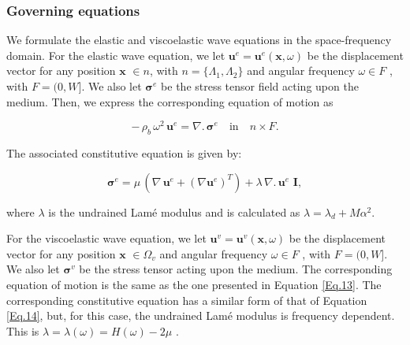 \documentclass[draft]{agujournal2019}
\begin{document}
\subsubsection{Governing equations}
We formulate the elastic and viscoelastic wave equations in the space-frequency domain. For the elastic wave equation, we let $\bm{u}^e=\bm{u}^e (\bm{x},\omega)$ be the displacement vector for any position $\bm{x}$ $\in n$, with  $n= \{\Lambda_1, \Lambda_2\} $ and angular frequency  $\omega \in F$ , with $F =(0,W]$. We also let $\bm{\sigma}^e$ be the stress tensor field acting upon the medium. Then, we express the corresponding equation of motion as
\begin{linenomath*}
\begin{equation}\label{Eq.13}
- \, \rho_b \,\omega^2 \, \bm{u}^e = \nabla . \, \bm{\sigma}^e \quad  \textrm{in} \quad n \times F.
\end{equation}
\end{linenomath*}
The associated constitutive equation is given by: 
\begin{linenomath*}
\begin{equation}\label{Eq.14}
\bm{\sigma}^e = \mu \,  \left( \nabla \, \bm{u}^e + ({\nabla  \bm{u}^e})^T  \right) + \lambda \,  \nabla . \, \bm{u}^e\,\, \bm{I},
\end{equation}
\end{linenomath*}
where $\lambda$ is the undrained Lamé modulus and is calculated as $\lambda = \lambda_d + M \alpha^2$.

For the viscoelastic wave equation, we let $\bm{u}^v=\bm{u}^v (\bm{x},\omega)$ be the displacement vector for any position $\bm{x}$  $ \in \Omega_v$ and angular frequency $\omega \in F$ , with $F =(0,W]$. We also let $\bm{\sigma}^v$ be the stress tensor acting upon the medium.  The corresponding equation of motion is the same as the one presented in Equation \eqref{Eq.13}. The corresponding constitutive equation has a similar form of that of Equation \eqref{Eq.14}, but, for this case, the undrained Lamé modulus is frequency dependent. This is $\lambda =\lambda(\omega)= H(\omega)-2\mu $ .

\end{document}
